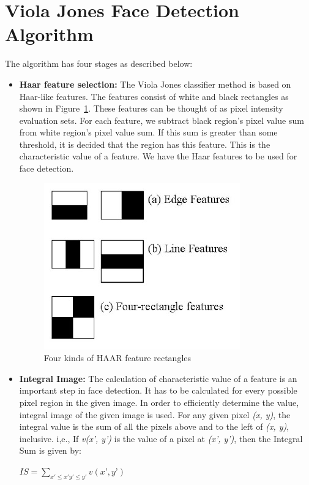 \section{Viola Jones Face Detection Algorithm}\label{sec:viola}

The algorithm has four stages as described below:

\begin{itemize}

\item \textbf{Haar feature selection:}
The Viola Jones classifier method is based on Haar-like features. The features consist of 
white and black rectangles as shown in Figure~\ref{fig:haar}. These features can be thought of as pixel intensity evaluation sets. 
For each feature, we subtract black region’s pixel value sum from white region’s pixel value sum. 
If this sum is greater than some threshold, it is decided that the region has this feature. 
This is the characteristic value of a feature. We have the Haar features to be used for face detection.

\begin{figure}[h]
  \centering
  \includegraphics[width=0.5\linewidth]{figs/haar.jpg}
  \caption{Four kinds of HAAR feature rectangles \textnormal{\small }  }
  \label{fig:haar}
\end{figure}

\item \textbf{Integral Image:}
The calculation of characteristic value of a feature is an important step in 
face detection. It has to be calculated for every possible pixel region in the given image. 
In order to efficiently determine the value, integral image of the given image is used. 
For any given pixel \emph{(x, y)}, the integral value is the sum of all the pixels above and to 
the left of \emph{(x, y)}, inclusive.
i,e., If \emph{v(x’, y’)} is the value of a pixel at \emph{(x’, y’)},  then the
Integral Sum is given by:

\vspace{0.1in}
\begin{center}
\begin{math}
    IS = \sum\limits_{x'\leqslant  x'y' \leqslant    y'} {v(x’, y’)}
\end{math}
\end{center}




\end{itemize}

